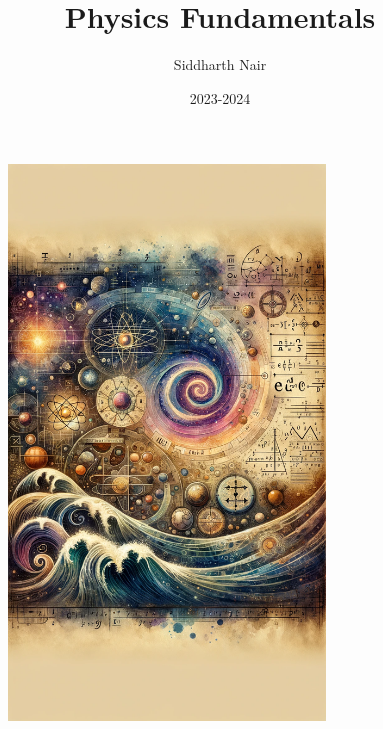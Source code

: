 \documentclass[11pt, letterpaper, openany]{book}
\title{Physics Fundamentals}%
\author{Siddharth Nair}
\date{2023-2024}
\begin{document}
\frontmatter
\maketitle

\begin{figure}[htbp]
  \centering
  \includegraphics[width=0.75\textwidth]{titleCover.png}
\end{figure}
\FloatBarrier

\tableofcontents
\end{document}
